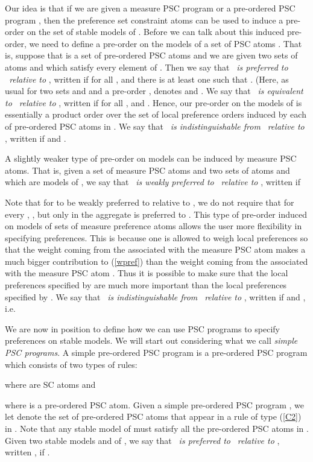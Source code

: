\documentclass[letterpaper]{article}\usepackage{aaai}
\begin{document}
Our idea is that if we are given a measure PSC program or a pre-ordered PSC
program , then the preference set constraint atoms can be used to induce a
pre-order on the set of stable models of . Before we can talk about this
induced pre-order, we need to define a pre-order on the models of a set of PSC
atoms . That is, suppose that  is a set of pre-ordered PSC atoms and we
are given two sets of atoms  and  which satisfy every element of
. Then we say that \emph{\ is preferred to }\emph{\ relative
to }, written  if for all ,  and there is at least one
 such that .
(Here, as usual for two sets  and  and a pre-order ,  denotes
 and . We say that \emph{\ is equivalent to
}\emph{\ relative to }, written  if for
all ,  and
. Hence, our pre-order on the models of  is
essentially a product order over the set of local preference orders induced by
each of pre-ordered PSC atoms in . We say that \emph{\ is
indistinguishable from }\emph{\ relative to }, written  if  and .

A slightly weaker type of pre-order on models can be induced by measure PSC
atoms. That is, given a set  of measure PSC atoms and two sets of atoms
 and  which are models of , we say that \emph{\ is
weakly preferred to }\emph{\ relative to }, written  if

Note that for  to be weakly preferred to  relative to , we do
not require that for every , , but only in the aggregate  is
preferred to . This type of pre-order induced on models of sets of
measure preference atoms allows the user more flexibility in specifying
preferences. This is because one is allowed to weigh local preferences so that
the weight coming from the  associated with the measure PSC atom
 makes a much bigger contribution to
(\ref{wpref}) than the weight coming from the  associated with the
measure PSC atom . Thus it is possible to make
sure that the local preferences specified by  are
much more important than the local preferences specified by . We say that \emph{\ is indistinguishable from
}\emph{\ relative to }, written  if
 and , i.e.



We are now in position to define how we can use PSC programs to specify
preferences on stable models. We will start out considering what we call
\emph{simple PSC programs}. A simple pre-ordered PSC program is a pre-ordered
PSC program  which consists of two types of rules:

where  are SC atoms and

where  is a pre-ordered PSC atom. Given a simple pre-ordered PSC program
, we let  denote the set of pre-ordered PSC atoms
that appear in a rule of type (\ref{C2}) in . Note that any stable model
 of  must satisfy all the pre-ordered PSC atoms in . Given two
stable models  and  of , we say that \emph{\ is
preferred to }\emph{\ relative to }, written , if .
\end{document}
